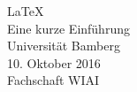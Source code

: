 \begin{center}
\Huge \LaTeX\\
\vspace{5mm} \LARGE Eine kurze Einführung\\
\vspace{12mm} \Large  Universität Bamberg\\[5mm]
\large 10. Oktober 2016\\ 
Fachschaft WIAI\normalsize \\
\end{center}
